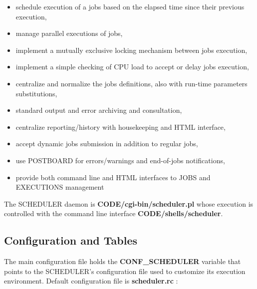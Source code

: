\begin{itemize}
\item   schedule execution of a jobs based on the elapsed time since their previous execution,
\item   manage parallel executions of jobs,
\item   implement a mutually exclusive locking mechanism between jobs execution,
\item   implement a simple checking of CPU load to accept or delay jobs execution,
\item   centralize and normalize the jobs definitions, also with run-time parameters substitutions,
\item   standard output and error archiving and consultation,
\item   centralize reporting/history with housekeeping and HTML interface,
\item   accept dynamic jobs submission in addition to regular jobs,
\item   use \webobs POSTBOARD for errors/warnings and end-of-jobs notifications,
\item   provide both command line and HTML interfaces to JOBS and EXECUTIONS management 
\end{itemize}

The SCHEDULER daemon is \textbf{CODE/cgi-bin/scheduler.pl} whose execution is controlled with the command line interface \textbf{CODE/shells/scheduler}.

\subsection{Configuration and Tables}

The main configuration file  holds the \textbf{CONF\_SCHEDULER} variable that points to the SCHEDULER's configuration file used to 
customize its execution environment. Default configuration file is \textbf{scheduler.rc} :

